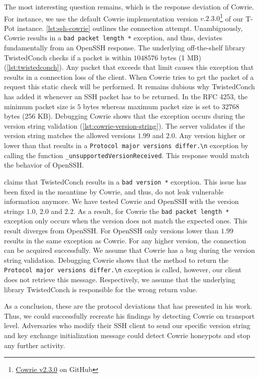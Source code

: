 The most interesting question remains, which is the response deviation of Cowrie.
For instance, we use the default Cowrie implementation version $v.2.3.0$\footnote{\href{https://github.com/cowrie/cowrie/commit/555ff10d95f6239d9d6efee8a2d05def316ab144}{Cowrie v2.3.0} on GitHub} of our T-Pot instance.
\autoref{lst:ssh-cowrie} outlines the connection attempt.
Unambiguously, Cowrie results in a  \verb|bad packet length *| exception, and thus, deviates fundamentally from an Open\-SSH response.
The underlying off-the-shelf library TwistedConch checks if a packet is within $1048576$ bytes (1 MB) (\autoref{lst:twistedconch}).
Any packet that exceeds that limit causes this exception that results in a connection loss of the client.
When Cowrie tries to get the packet of a request this static check will be performed.
It remains dubious why TwistedConch has added it whenever an SSH packet has to be returned.
In the RFC 4253, the minimum packet size is $5$ bytes whereas maximum packet size is set to $32768$ bytes (256 KB).
Debugging Cowrie shows that the exception occurs during the version string validation (\autoref{lst:cowrie-version-string}).
The server validates if the version string matches the allowed versions $1.99$ and $2.0$.
Any version higher or lower than that results in a \verb|Protocol major versions differ.\n| exception by calling the function \verb|_unsupportedVersionReceived|.
This response would match the behavior of OpenSSH.

\citet{vetterl2020} claims that TwistedConch results in a \verb|bad version *| exception.
This issue has been fixed in the meantime by Cowrie, and thus, do not leak vulnerable information anymore.
We have tested Cowrie and OpenSSH with the version strings $1.0$, $2.0$ and $2.2$. 
As a result, for Cowrie the \verb|bad packet length *| exception only occurs when the version does not match the expected ones.
This result diverges from OpenSSH.
For OpenSSH only versions lower than $1.99$ results in the same exception as Cowrie.
For any higher version, the connection can be acquired successfully.
We assume that Cowrie has a bug during the version string validation.
Debugging Cowrie shows that the method to return the \verb|Protocol major versions differ.\n| exception is called, however, our client does not retrieve this message.
Respectively, we assume that the underlying library TwistedConch is responsible for the wrong return value.

As a conclusion, these are the protocol deviations that \citet{vetterl2020} has presented in his work.
Thus, we could successfully recreate his findings by detecting Cowrie on transport level.
Adversaries who modify their SSH client to send our specific version string and key exchange initialization message could detect Cowrie honeypots and stop any further activity.

